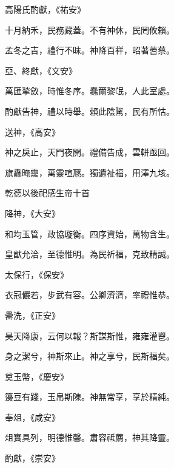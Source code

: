 \begin{pinyinscope}
 高陽氏酌獻，《祐安》



 十月納禾，民務藏蓋。不有神休，民罔攸賴。



 孟冬之吉，禮行不昧。神降百祥，昭著蓍蔡。



 亞、終獻，《文安》



 萬匯揫斂，時惟冬序。蠢爾黎氓，人此室處。



 酌獻告神，禮以時舉。賴此陰騭，民有所怙。



 送神，《高安》



 神之戾止，天門夜開。禮備告成，雲軿亟回。



 旗纛晻靄，萬靈喧豗。獨遺祉福，用澤九垓。



 乾德以後祀感生帝十首



 降神，《大安》



 和均玉管，政協璇衡。四序資始，萬物含生。



 皇猷允洽，至德惟明。為民祈福，克致精誠。



 太保行，《保安》



 衣冠儼若，步武有容。公卿濟濟，率禮惟恭。



 罍洗，《正安》



 昊天降康，云何以報？斯謀斯惟，雍雍灌鬯。



 身之潔兮，神斯來止。神之享兮，民斯福矣。



 奠玉幣，《慶安》



 籩豆有踐，玉帛斯陳。神無常享，享於精純。



 奉俎，《咸安》



 俎實具列，明德惟馨。肅容祗薦，神其降靈。



 酌獻，《崇安》




\end{pinyinscope}
